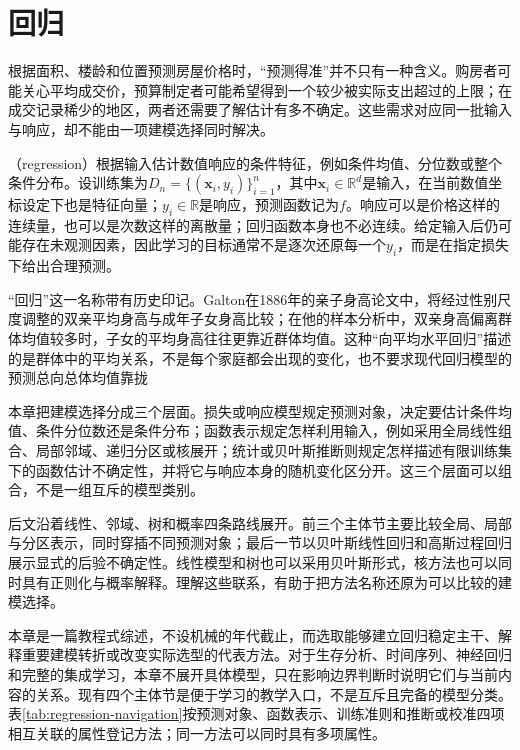 \chapter{回归}
\label{chap:regression}

根据面积、楼龄和位置预测房屋价格时，“预测得准”并不只有一种含义。购房者可能关心平均成交价，预算制定者可能希望得到一个较少被实际支出超过的上限；在成交记录稀少的地区，两者还需要了解估计有多不确定。这些需求对应同一批输入与响应，却不能由一项建模选择同时解决。

（regression）根据输入估计数值响应的条件特征，例如条件均值、分位数或整个条件分布。设训练集为$D_n=\{(\bm{x}_i,y_i)\}_{i=1}^{n}$，其中$\bm{x}_i\in\mathbb{R}^{d}$是输入，在当前数值坐标设定下也是特征向量；$y_i\in\mathbb{R}$是响应，预测函数记为$f$。响应可以是价格这样的连续量，也可以是次数这样的离散量；回归函数本身也不必连续。给定输入后仍可能存在未观测因素，因此学习的目标通常不是逐次还原每一个$y_i$，而是在指定损失下给出合理预测。

“回归”这一名称带有历史印记。Galton在1886年的亲子身高论文中，将经过性别尺度调整的双亲平均身高与成年子女身高比较；在他的样本分析中，双亲身高偏离群体均值较多时，子女的平均身高往往更靠近群体均值。这种“向平均水平回归”描述的是群体中的平均关系，不是每个家庭都会出现的变化，也不要求现代回归模型的预测总向总体均值靠拢

本章把建模选择分成三个层面。损失或响应模型规定预测对象，决定要估计条件均值、条件分位数还是条件分布；函数表示规定怎样利用输入，例如采用全局线性组合、局部邻域、递归分区或核展开；统计或贝叶斯推断则规定怎样描述有限训练集下的函数估计不确定性，并将它与响应本身的随机变化区分开。这三个层面可以组合，不是一组互斥的模型类别。

后文沿着线性、邻域、树和概率四条路线展开。前三个主体节主要比较全局、局部与分区表示，同时穿插不同预测对象；最后一节以贝叶斯线性回归和高斯过程回归展示显式的后验不确定性。线性模型和树也可以采用贝叶斯形式，核方法也可以同时具有正则化与概率解释。理解这些联系，有助于把方法名称还原为可以比较的建模选择。

本章是一篇教程式综述，不设机械的年代截止，而选取能够建立回归稳定主干、解释重要建模转折或改变实际选型的代表方法。对于生存分析、时间序列、神经回归和完整的集成学习，本章不展开具体模型，只在影响边界判断时说明它们与当前内容的关系。现有四个主体节是便于学习的教学入口，不是互斥且完备的模型分类。表\ref{tab:regression-navigation}按预测对象、函数表示、训练准则和推断或校准四项相互关联的属性登记方法；同一方法可以同时具有多项属性。

